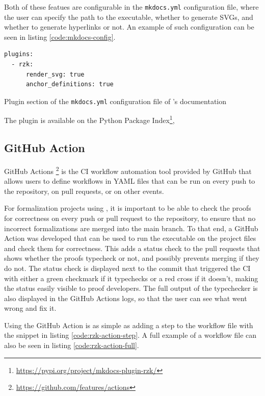 Both of these featues are configurable in the \texttt{mkdocs.yml} configuration file,
where the user can specify the path to the \Rzk{} executable, whether to generate SVGs,
and whether to generate hyperlinks or not.
An example of such configuration can be seen in listing \ref{code:mkdocs-config}.

\begin{listing}
  \begin{verbatim}
plugins:
  - rzk:
      render_svg: true
      anchor_definitions: true
  \end{verbatim}
  \caption{Plugin section of the \texttt{mkdocs.yml} configuration file of \Rzk{}'s documentation}
  \label{code:mkdocs-config}
\end{listing}

The plugin is available on the Python Package Index\footnote{
  \url{https://pypi.org/project/mkdocs-plugin-rzk/}},

\subsection{GitHub Action}

GitHub Actions \footnote{\url{https://github.com/features/actions}} is the CI workflow automation
tool provided by GitHub that allows users to define workflows in YAML files that can be run
on every push to the repository, on pull requests, or on other events.

For formalization projects using \Rzk{}, it is important to be able to check the proofs
for correctness on every push or pull request to the repository, to ensure that no incorrect
formalizations are merged into the main branch.
To that end, a GitHub Action was developed that can be used to run the \Rzk{} executable
on the project files and check them for correctness.
This adds a status check to the pull requests that shows whether the proofs typecheck or not,
and possibly prevents merging if they do not.
The status check is displayed next to the commit that triggered the CI with either
a green checkmark if it typechecks or a red cross if it doesn't, making the status easily visible
to proof developers.
The full output of the typechecker is also displayed in the GitHub Actions logs, so that the user
can see what went wrong and fix it.

Using the GitHub Action is as simple as adding a step to the workflow file with the snippet
in listing \ref{code:rzk-action-step}.
A full example of a workflow file can also be seen in listing \ref{code:rzk-action-full}.

